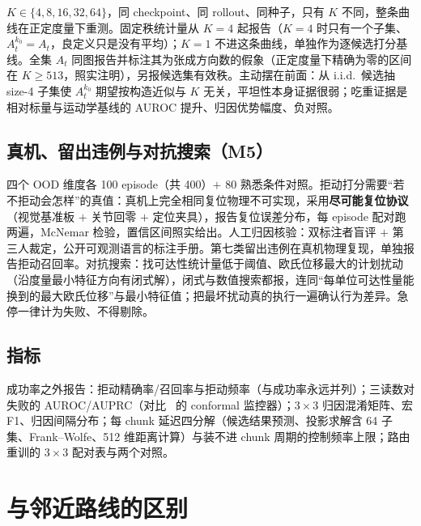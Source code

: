 \documentclass[11pt,a4paper]{ctexart}
\newcommand{\At}{A_t}
\newcommand{\Ak}{A_t^{k_0}}
\begin{document}
$K\in\{4,8,16,32,64\}$，同 checkpoint、同 rollout、同种子，只有 $K$ 不同，整条曲线在正定度量下重测。固定秩统计量从 $K{=}4$ 起报告（$K{=}4$ 时只有一个子集、$\Ak=\At$，良定义只是没有平均）；$K{=}1$ 不进这条曲线，单独作为逐候选打分基线。全集 $\At$ 同图报告并标注其为张成方向数的假象（正定度量下精确为零的区间在 $K\ge513$，照实注明），另报候选集有效秩。主动摆在前面：从 i.i.d.\ 候选抽 size-4 子集使 $\Ak$ 期望按构造近似与 $K$ 无关，平坦性本身证据很弱；吃重证据是相对标量与运动学基线的 AUROC 提升、归因优势幅度、负对照。

\subsection{真机、留出违例与对抗搜索（M5）}

四个 OOD 维度各 100 episode（共 400）$+$ 80 熟悉条件对照。拒动打分需要``若不拒动会怎样''的真值：真机上完全相同复位物理不可实现，采用\textbf{尽可能复位协议}（视觉基准板 $+$ 关节回零 $+$ 定位夹具），报告复位误差分布，每 episode 配对跑两遍，McNemar 检验，置信区间照实给出。人工归因核验：双标注者盲评 $+$ 第三人裁定，公开可观测语言的标注手册。第七类留出违例在真机物理复现，单独报告拒动召回率。对抗搜索：找可达性统计量低于阈值、欧氏位移最大的计划扰动（沿度量最小特征方向有闭式解），闭式与数值搜索都报，连同``每单位可达性量能换到的最大欧氏位移''与最小特征值；把最坏扰动真的执行一遍确认行为差异。急停一律计为失败、不得剔除。

\subsection{指标}

成功率之外报告：拒动精确率/召回率与拒动频率（与成功率永远并列）；三读数对失败的 AUROC/AUPRC（对比~\cite{howvlasfail} 的 conformal 监控器）；$3\times3$ 归因混淆矩阵、宏 F1、归因间隔分布；每 chunk 延迟四分解（候选结果预测、投影求解含 64 子集、Frank--Wolfe、512 维距离计算）与装不进 chunk 周期的控制频率上限；路由重训的 $3\times3$ 配对表与两个对照。

\section{与邻近路线的区别}\label{sec:related}
\end{document}
